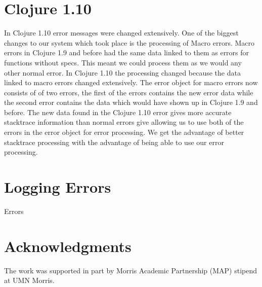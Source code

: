 \documentclass[12pt]{article}
\begin{document}
\section{Clojure 1.10}
In Clojure 1.10 error messages were changed extensively. 
One of the biggest changes to our system which took place is the processing of Macro errors. 
Macro errors in Clojure 1.9 and before had the same data linked to them as errors for functions without specs. 
This meant we could process them as we would any other normal error. 
In Clojure 1.10 the processing changed because the data linked to macro errors changed extensively. 
The error object for macro errors now consists of of two errors, the first of the errors contains the new error data while the second error contains the data which would have shown up in Clojure 1.9 and before. 
The new data found in the Clojure 1.10 error gives more accurate stacktrace information than normal errors give allowing us to use both of the errors in the error object for error processing. 
We get the advantage of better stacktrace processing with the advantage of being able to use our error processing.


\section{Logging Errors}
Errors

\section{Acknowledgments}
The work was supported in part by Morris Academic Partnership (MAP) stipend at UMN Morris.



\end{document}
